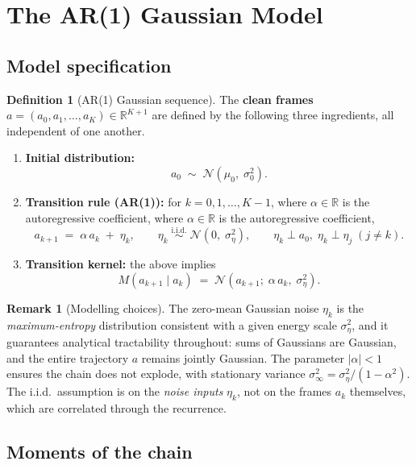 \documentclass[12pt, a4paper]{article}
\def\ba{a}%
\def\bm#1{#1}%
\theoremstyle{definition}
\newtheorem{definition}{Definition}[section]
\newtheorem{remark}{Remark}[section]
\newcommand{\R}{\mathbb{R}}
\newcommand{\N}{\mathcal{N}}
\newcommand{\ba}{\bm{a}}
\begin{document}
\section{The AR(1) Gaussian Model}

\subsection{Model specification}

\begin{definition}[AR(1) Gaussian sequence]
The \textbf{clean frames} $\ba = (a_0, a_1, \ldots, a_K) \in \R^{K+1}$
are defined by the following three ingredients, all independent of one
another.
\begin{enumerate}[label=(\roman*)]
  \item \textbf{Initial distribution:}
  \[
    a_0 \;\sim\; \N(\mu_0,\; \sigma_0^2).
  \]
  \item \textbf{Transition rule (AR(1)):} for $k = 0, 1, \ldots, K-1$, where $\alpha \in \R$ is the autoregressive coefficient, where $\alpha \in \R$ is the autoregressive coefficient,
  \[
    a_{k+1} \;=\; \alpha\, a_k \;+\; \eta_k,
    \qquad
    \eta_k \;\overset{\mathrm{i.i.d.}}{\sim}\; \N(0,\; \sigma_\eta^2),
    \qquad
    \eta_k \perp a_0,\; \eta_k \perp \eta_j\; (j \neq k).
  \]
  \item \textbf{Transition kernel:} the above implies
  \[
    M(a_{k+1} \mid a_k) \;=\; \N\!\left(a_{k+1};\; \alpha\,a_k,\;
    \sigma_\eta^2\right).
  \]
\end{enumerate}
\end{definition}

\begin{remark}[Modelling choices]
The zero-mean Gaussian noise $\eta_k$ is the \emph{maximum-entropy}
distribution consistent with a given energy scale $\sigma_\eta^2$,
and it guarantees analytical tractability throughout: sums of Gaussians
are Gaussian, and the entire trajectory $\ba$ remains jointly Gaussian.
The parameter $|\alpha| < 1$ ensures the chain does not explode, with
stationary variance $\sigma_\infty^2 = \sigma_\eta^2/(1-\alpha^2)$.
The i.i.d.\ assumption is on the \emph{noise inputs} $\eta_k$, not on the
frames $a_k$ themselves, which are correlated through the recurrence.
\end{remark}

\subsection{Moments of the chain}
\end{document}
